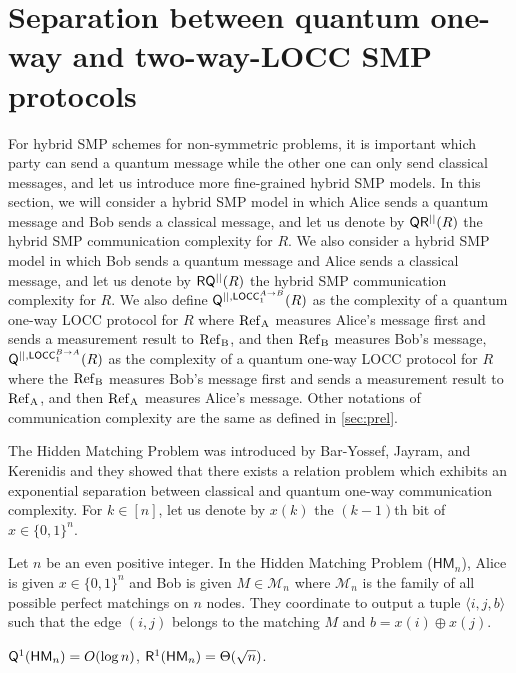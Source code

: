 \section{Separation between quantum one-way and two-way-LOCC SMP protocols}\label{sec:separation}

For hybrid SMP schemes for non-symmetric problems, it is important which party can send a quantum message while the other one can only send classical messages, and let us introduce more fine-grained hybrid SMP models. In this section, we will consider a hybrid SMP model in which Alice sends a quantum message and Bob sends a classical message, and let us denote by $\mathsf{Q} \mathsf{R}^{||}(R)$ the hybrid SMP communication complexity for $R$. We also consider a hybrid SMP model in which Bob sends a quantum message and Alice sends a classical message, and let us denote by $\mathsf{R} \mathsf{Q}^{||}(R)$ the hybrid SMP communication complexity for $R$. 
We also define $\mathsf{Q}^{||,\mathsf{LOCC}_1^{A \rightarrow B}}(R)$ as the complexity of a quantum one-way LOCC protocol for $R$ where $\rm{Ref}_A$ measures Alice's message first and sends a measurement result to $\rm{Ref}_B$, and then $\rm{Ref}_B$ measures Bob's message, $\mathsf{Q}^{||,\mathsf{LOCC}_1^{B \rightarrow A}}(R)$ as the complexity of a quantum one-way LOCC protocol for $R$ where the $\rm{Ref}_B$ measures Bob's message first and sends a measurement result to $\rm{Ref}_A$, and then $\rm{Ref}_A$ measures Alice's message.
Other notations of communication complexity are the same as defined in \cref{sec:prel}.

The Hidden Matching Problem was introduced by Bar-Yossef, Jayram, and Kerenidis \cite{BYJK08} and they showed that there exists a relation problem which exhibits an exponential separation between classical and quantum one-way communication complexity. For $k \in [n]$, let us denote by $x(k)$ the $(k-1)$th bit of $x \in \{0,1\}^n$.

\begin{definition}
    Let $n$ be an even positive integer. In the Hidden Matching Problem ($\mathsf{HM}_n$), Alice is given $x \in \{0,1\}^n$ and Bob is given $M \in \mathcal{M}_n$ where $ \mathcal{M}_n$ is the family of all possible perfect matchings on $n$ nodes. They coordinate to output a tuple $\langle i,j,b \rangle$ such that the edge $(i,j)$ belongs to the matching $M$ and $b = x(i) \oplus x(j)$.
\end{definition}

\begin{theorem}
    $\mathsf{Q}^{1}(\mathsf{HM}_n) = O(\log n)$, $\mathsf{R}^{1}(\mathsf{HM}_n) = \Theta(\sqrt{n})$.
\end{theorem}


